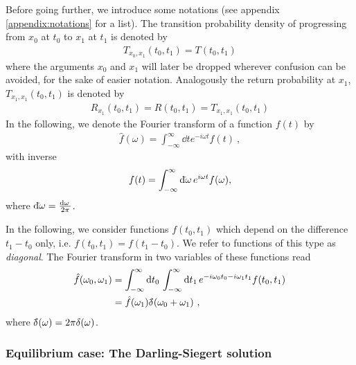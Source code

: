 \documentclass[%
 reprint,
superscriptaddress,
nofootinbib,
 amsmath,amssymb,
 aps,
prx,
]{revtex4-2}
\begin{document}
Before going further, we introduce some notations (see appendix \ref{appendix:notations} for a list). The transition probability density of progressing from $x_0$ at $t_0$  to $x_1$ at $t_1$ is denoted by 
\begin{align}
    T_{x_0, x_1}(t_0, t_1) = T(t_0,t_1)
\end{align}
where the arguments $x_0$ and $x_1$ will later be dropped wherever confusion can be avoided, for the sake of easier notation. %
Analogously the return probability at $x_1$, $T_{x_1,x_1}( t_0,t_1)$ is denoted by 
\begin{align}
   R_{x_1}( t_0,t_1) = R(t_0,t_1)= T_{x_1,x_1}( t_0,t_1)
\end{align}
In the following, we denote the Fourier transform of a function $f(t)$ by
\begin{align}
\label{eq:Fourier_transform_functional}
\hat{f}(\omega)=\int_{-\infty}^{\infty} \dd{t} e^{-i \omega t} f(t)~,
\end{align}
with inverse
\begin{align}
\label{eq:Fourier_transform_inverse_functional}
f(t)=\int_{-\infty}^{\infty} \mathrm{d}\hspace*{-0.08em}\bar{}\hspace*{0.1em}\omega\, e^{i \omega t} f(\omega),
\end{align}
 where $\mathrm{d}\hspace*{-0.08em}\bar{}\hspace*{0.1em}{\omega} = \frac{\mathrm{d}{\omega}\,}{2\pi }$.
 


In the following, we consider functions $f(t_0,t_1)$ which depend on the difference $t_1-t_0$ only, i.e. $f(t_0,t_1)=f(t_1-t_0)$. We refer to functions of this type  as \emph{diagonal}. The Fourier transform in two variables of these functions read
\begin{align}
  \hat{f}(\omega_0, \omega_1) &=\int_{-\infty}^{\infty} \mathrm{d}{t_0}\,\int_{-\infty}^{\infty}\mathrm{d}{t_1}\,  e^{- i \omega_0 t_0 - i  \omega _1 t_1} f(t_0,t_1)\nonumber\\
&  =\hat{ f}(\omega_1) \delta\hspace*{-0.24em}\bar{}\hspace*{0.1em}\,(\omega_0 + \omega_1) ~,  \label{eq:diagonal_function}
\end{align}
where $\delta\hspace*{-0.24em}\bar{}\hspace*{0.1em}\,(\omega) =2\pi \delta(\omega)$.



\subsubsection{Equilibrium case: The Darling-Siegert solution}
\end{document}
